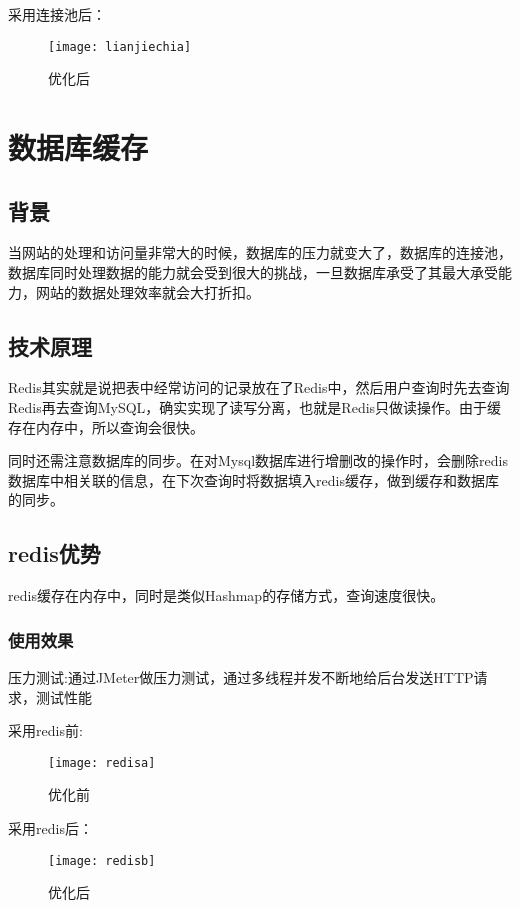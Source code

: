  
采用连接池后：
\begin{figure}[htbp]
	\centering
	\texttt{[image: lianjiechia]}
	\caption{优化后}
	\vspace{\baselineskip}
\end{figure}
\section{数据库缓存}
\subsection{背景}

当网站的处理和访问量非常大的时候，数据库的压力就变大了，数据库的连接池，数据库同时处理数据的能力就会受到很大的挑战，一旦数据库承受了其最大承受能力，网站的数据处理效率就会大打折扣。

\subsection{技术原理}
Redis其实就是说把表中经常访问的记录放在了Redis中，然后用户查询时先去查询Redis再去查询MySQL，确实实现了读写分离，也就是Redis只做读操作。由于缓存在内存中，所以查询会很快。

同时还需注意数据库的同步。在对Mysql数据库进行增删改的操作时，会删除redis数据库中相关联的信息，在下次查询时将数据填入redis缓存，做到缓存和数据库的同步。

\subsection{redis优势}
redis缓存在内存中，同时是类似Hashmap的存储方式，查询速度很快。

\subsubsection{使用效果}

压力测试:通过JMeter做压力测试，通过多线程并发不断地给后台发送HTTP请求，测试性能

采用redis前:
\begin{figure}[htbp]
	\centering
	\texttt{[image: redisa]}
	\caption{优化前}
	\vspace{\baselineskip}
\end{figure}


采用redis后：
\begin{figure}[htbp]
	\centering
	\texttt{[image: redisb]}
	\caption{优化后}
	\vspace{\baselineskip}
\end{figure}


